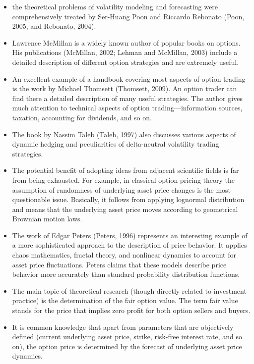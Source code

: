 \begin{itemize}
            \item the theoretical problems of volatility modeling and forecasting were comprehensively treated by Ser-Huang Poon and Riccardo Rebonato (Poon, 2005, and Rebonato, 2004).
            \item Lawrence McMillan is a widely known author of popular books on options. His publications (McMillan, 2002; Lehman and McMillan, 2003) include a detailed description of different option strategies and are extremely useful.
            \item An excellent example of a handbook covering most aspects of option trading is the work by Michael Thomsett (Thomsett, 2009). An option trader can find there a detailed description of many useful strategies. The author gives much attention to technical aspects of option trading—information sources, taxation, accounting for dividends, and so on.
            \item The book by Nassim Taleb (Taleb, 1997) also discusses various aspects of dynamic hedging and peculiarities of delta-neutral volatility trading strategies.
            \item The potential benefit of adopting ideas from adjacent scientific fields is far from being exhausted. For example, in classical option pricing theory the assumption of randomness of underlying asset price changes is the most questionable issue. Basically, it follows from applying lognormal distribution and means that the underlying asset price moves according to geometrical Brownian motion laws.
            \item The work of Edgar Peters (Peters, 1996) represents an interesting example of a more sophisticated approach to the description of price behavior. It applies chaos mathematics, fractal theory, and nonlinear dynamics to account for asset price fluctuations. Peters claims that these models describe price behavior more accurately than standard probability distribution functions.
            \item The main topic of theoretical research (though directly related to investment practice) is the determination of the fair option value. The term fair value stands for the price that implies zero profit for both option sellers and buyers.
            \item It is common knowledge that apart from parameters that are objectively defined (current underlying asset price, strike, risk-free interest rate, and so on), the option price is determined by the forecast of underlying asset price dynamics.

\end{itemize}
